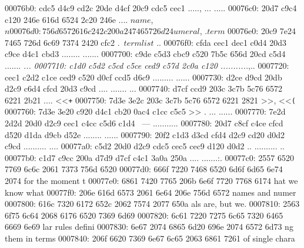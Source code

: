 \begin{bo
00010e0: 7865 647d 5c62 6567 696e 7b76 6572 6261  xed}
\begin{verba
00010f0: 7469 6d7d 0a20 2023 7479 7065 2074 6572  tim}
\begin{
0001c40: 7665 7262 6174 696d 7d0a 2020 236c 6574  verbatim}
\begin{boxe
00027a0: 647d 5c62 6567 696e 7b76 6572 6261 7469  d}
\begin{verbati
00027b0: 6d7d 0a20 2023 6c65 7420 696e 6669 7865  m}
\begin{v
0002c60: 6572 6261 7469 6d7d 0a20 2023 6c65 7420  erbatim}
\begin{
0002dc0: 7665 7262 6174 696d 7d0a 2020 236c 6574  verbatim}
\begin{boxed
0002f30: 7d5c 6265 6769 6e7b 7665 7262 6174 696d  }
\begin{verbatim
0002f40: 7d0a 2020 236c 6574 2068 6428 683a 3a74  }
\begin{v
0003e60: 6572 6261 7469 6d7d 0a20 2023 236f 7065  erbatim}
\begin{boxed
00042b0: 7d5c 6265 6769 6e7b 7665 7262 6174 696d  }
\begin{verbatim
00042c0: 7d0a 2020 2328 782c 7429 3b3b 0a20 202d  }
\begin{boxed}
00076b0: cdc5 d4c9 cd2c 20de d4cf 20c9 cdc5 cec1  ....., ... .....
00076c0: 20d7 c9c4 c120 246e 616d 6524 2c20 246e   .... $name$, $n
00076d0: 756d 6572 616c 242c 200a 2474 6572 6d24  umeral$, .$term$
00076e0: 20c9 7e24 7465 726d 6c69 7374 2420 cfc2   .~$termlist$ ..
00076f0: cfda cec1 dec1 c0d4 20d3 c9ce d4c1 cbd3  ........ .......
0007700: c9de c5d3 cbc9 c520 7b5c 656d 20cd c5d4  ....... {\em ...
0007710: c1d0 c5d2 c5cd c5ce ced9 c57d 2c0a c120  ...........},.. 
0007720: cec1 c2d2 c1ce ced9 c520 d0cf ccd5 d6c9  ......... ......
0007730: d2ce d9cd 20db d2c9 c6d4 cfcd 20d3 c9cd  .... ....... ...
0007740: d7cf ccd9 203c 3c7b 5c76 6572 6221 2b21  .... <<{\verb!+!
0007750: 7d3e 3e2c 203c 3c7b 5c76 6572 6221 2821  }>>, <<{\verb!(!
0007760: 7d3e 3e20 c920 d4c1 cb20 0ac4 c1cc c5c5  }>> . ... ......
0007770: 7e2d 2d2d 20d0 d2c9 cec1 c4cc c5d6 c1d4  ~--- ...........
0007780: 20d7 c8cf c4ce cfcd d520 d1da d9cb d52e   ........ ......
0007790: 20f2 c1d3 d3cd cfd4 d2c9 cd20 d0d2 c9cd   .......... ....
00077a0: c5d2 20d0 d2c9 cdc5 cec5 cec9 d120 d0d2  .. .......... ..
00077b0: c1d7 c9cc 200a d7d9 d7cf c4c1 3a0a 250a  .... .......:.%
00077c0: 2557 6520 7769 6c6c 2061 7373 756d 6520  %
00077d0: 666f 7220 7468 6520 6d6f 6d65 6e74 2074  for the moment t
00077e0: 6861 7420 7765 206b 6e6f 7720 7768 6174  hat we know what
00077f0: 206e 616d 6573 2061 6e64 206e 756d 6572   names and numer
0007800: 616c 7320 6172 652c 2062 7574 2077 650a  als are, but we.
0007810: 2563 6f75 6c64 2068 6176 6520 7369 6d69  %
0007820: 6c61 7220 7275 6c65 7320 6465 6669 6e69  lar rules defini
0007830: 6e67 2074 6865 6d20 696e 2074 6572 6d73  ng them in terms
0007840: 206f 6620 7369 6e67 6c65 2063 6861 7261   of single chara

\end{boxed}
\end{verbatim
00042c0: 7d0a 2020 2328 782c 7429 3b3b 0a20 202d  }
\end{boxed
00042b0: 7d5c 6265 6769 6e7b 7665 7262 6174 696d  }
\end{v
0003e60: 6572 6261 7469 6d7d 0a20 2023 236f 7065  erbatim}
\end{verbatim
0002f40: 7d0a 2020 236c 6574 2068 6428 683a 3a74  }
\end{boxed
0002f30: 7d5c 6265 6769 6e7b 7665 7262 6174 696d  }
\end{
0002dc0: 7665 7262 6174 696d 7d0a 2020 236c 6574  verbatim}
\end{v
0002c60: 6572 6261 7469 6d7d 0a20 2023 6c65 7420  erbatim}
\end{verbati
00027b0: 6d7d 0a20 2023 6c65 7420 696e 6669 7865  m}
\end{boxe
00027a0: 647d 5c62 6567 696e 7b76 6572 6261 7469  d}
\end{
0001c40: 7665 7262 6174 696d 7d0a 2020 236c 6574  verbatim}
\end{verba
00010f0: 7469 6d7d 0a20 2023 7479 7065 2074 6572  tim}
\end{bo
00010e0: 7865 647d 5c62 6567 696e 7b76 6572 6261  xed}
